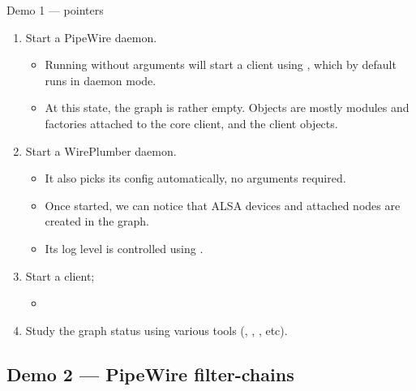 \begin{frame}[fragile]{Demo 1 — pointers}
  \begin{enumerate}

  \item Start a PipeWire daemon.

    \begin{itemize}
    \item Running  without arguments will start a client
      using , which by default runs in daemon mode.
    \item At this state, the graph is rather empty. Objects are mostly
      modules and factories attached to the core client, and the
      client objects.
    \end{itemize}

  \item Start a WirePlumber daemon.
    \begin{itemize}
    \item It also picks its config automatically, no arguments required.
    \item Once started, we can notice that ALSA devices and attached
      nodes are created in the graph.
    \item Its log level is controlled using .
    \end{itemize}

  \item Start a  client;

    \begin{itemize}
    \item {}
    \end{itemize}

  \item Study the graph status using various tools (,
      , , etc).

  \end{enumerate}
\end{frame}



\subsection{Demo 2 — PipeWire filter-chains}



